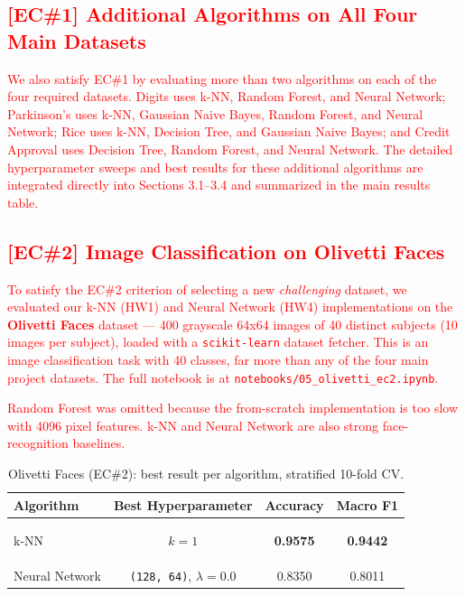 \documentclass[11pt]{article}
\newcommand{\best}[1]{\colorbox{bestgray}{\strut\textbf{#1}}}
\begin{document}
\subsection*{\textcolor{red}{[EC\#1] Additional Algorithms on All Four Main Datasets}}

\textcolor{red}{We also satisfy EC\#1 by evaluating more than two algorithms on each
of the four required datasets. Digits uses k-NN, Random Forest, and Neural Network;
Parkinson's uses k-NN, Gaussian Naive Bayes, Random Forest, and Neural Network; Rice
uses k-NN, Decision Tree, and Gaussian Naive Bayes; and Credit Approval uses Decision
Tree, Random Forest, and Neural Network. The detailed hyperparameter sweeps and best
results for these additional algorithms are integrated directly into Sections 3.1--3.4
and summarized in the main results table.}

\subsection*{\textcolor{red}{[EC\#2] Image Classification on Olivetti Faces}}

\textcolor{red}{To satisfy the EC\#2 criterion of selecting a new \emph{challenging}
dataset, we evaluated our k-NN (HW1) and Neural Network (HW4) implementations on the
\textbf{Olivetti Faces} dataset --- 400 grayscale 64x64 images of 40 distinct subjects
(10 images per subject), loaded with a \texttt{scikit-learn} dataset fetcher.
This is an image classification task with 40 classes, far more than any of the four
main project datasets. The full notebook is at
\texttt{notebooks/05\_olivetti\_ec2.ipynb}.}

\textcolor{red}{Random Forest was omitted because the from-scratch implementation is too
slow with 4096 pixel features. k-NN and Neural Network are also strong face-recognition
baselines.}

\begin{table}[H]
\centering
\caption{Olivetti Faces (EC\#2): best result per algorithm, stratified 10-fold CV.}
\begin{tabular}{lccc}
\toprule
Algorithm & Best Hyperparameter & Accuracy & Macro F1 \\
\midrule
k-NN           & $k=1$ & \best{0.9575} & \best{0.9442} \\
Neural Network & \texttt{(128, 64)}, $\lambda=0.0$ & 0.8350 & 0.8011 \\
\bottomrule
\end{tabular}
\end{table}
\end{document}
